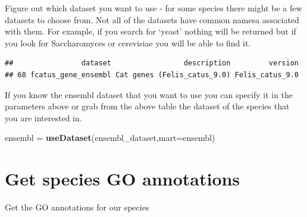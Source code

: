 \documentclass[
]{book}
\newenvironment{Shaded}{\begin{snugshade}}{\end{snugshade}}
\newcommand{\AttributeTok}[1]{\textcolor[rgb]{0.13,0.29,0.53}{#1}}
\newcommand{\CommentTok}[1]{\textcolor[rgb]{0.56,0.35,0.01}{\textit{#1}}}
\newcommand{\ConstantTok}[1]{\textcolor[rgb]{0.56,0.35,0.01}{#1}}
\newcommand{\FunctionTok}[1]{\textcolor[rgb]{0.13,0.29,0.53}{\textbf{#1}}}
\newcommand{\NormalTok}[1]{#1}
\newcommand{\OtherTok}[1]{\textcolor[rgb]{0.56,0.35,0.01}{#1}}
\newcommand{\SpecialCharTok}[1]{\textcolor[rgb]{0.81,0.36,0.00}{\textbf{#1}}}
\begin{document}
Figure out which dataset you want to use - for some species there might be a few datasets to choose from. Not all of the datasets have common namesa associated with them. For example, if you search for `yeast' nothing will be returned but if you look for Saccharomyces or cerevisiae you will be able to find it.

\begin{Shaded}
\end{Shaded}

\begin{verbatim}
##                dataset                 description         version
## 68 fcatus_gene_ensembl Cat genes (Felis_catus_9.0) Felis_catus_9.0
\end{verbatim}

If you know the ensembl dataset that you want to use you can specify it in the parameters above or grab from the above table the dataset of the species that you are interested in.

\begin{Shaded}
\begin{Highlighting}[]
\NormalTok{ensembl }\OtherTok{=} \FunctionTok{useDataset}\NormalTok{(ensembl\_dataset,}\AttributeTok{mart=}\NormalTok{ensembl)}
\end{Highlighting}
\end{Shaded}

\hypertarget{get-species-go-annotations}{%
\section{Get species GO annotations}\label{get-species-go-annotations}}

Get the GO annotations for our species
\end{document}
